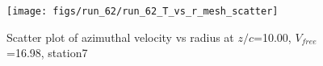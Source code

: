 \begin{figure}[H]
\centering
\texttt{[image: figs/run\_62/run\_62\_T\_vs\_r\_mesh\_scatter]}
\caption{Scatter plot of azimuthal velocity vs radius at $z/c$=10.00, $V_{free}$=16.98, station7}
\label{fig:run_62_T_vs_r_mesh_scatter}
\end{figure}


